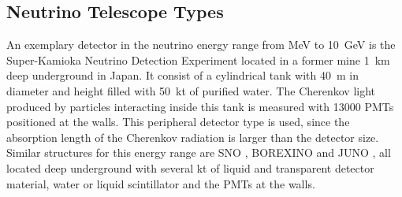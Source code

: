 
\subsection{Neutrino Telescope Types}

An exemplary detector in the neutrino energy range from MeV to \SI{10}{GeV} is the Super-Kamioka Neutrino Detection Experiment \cite{HyperKamiokande18} located in a former mine \SI{1}{km} deep underground in Japan.
It consist of a cylindrical tank with \SI{40}{m} in diameter and height filled with \SI{50}{kt} of purified water.
The Cherenkov light produced by particles interacting inside this tank is measured with \num{13000} PMTs positioned at the walls.
This peripheral detector type is used, since the absorption length of the Cherenkov radiation is larger than the detector size.
Similar structures for this energy range are SNO \cite{SNO20}, BOREXINO \cite{Borexino09} and JUNO \cite{JUNO19}, all located deep underground with several kt of liquid and transparent detector material, water or liquid scintillator and the PMTs at the walls.

